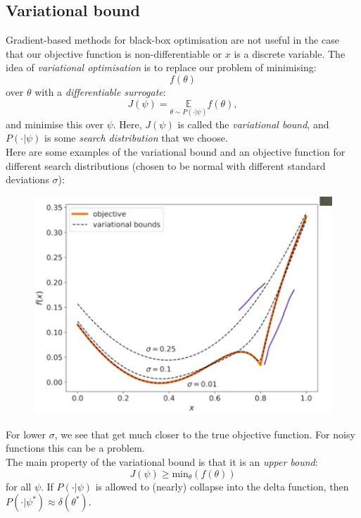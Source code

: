 \subsection{Variational bound}
Gradient-based methods for black-box optimisation are not useful in the case that our objective function is non-differentiable or $x$ is a discrete variable. The idea of \textit{variational optimisation} is to replace our problem of minimising:
\begin{equation*}
f(\theta)
\end{equation*}
over $\theta$ with a \textit{differentiable surrogate}:
\begin{equation*}
J(\psi) = \underset{\theta \sim P(\cdot|\psi)}{\mathbb{E}} f(\theta),
\end{equation*}
and minimise this over $\psi$. Here, $J(\psi)$ is called the \textit{variational bound}, and $P(\cdot | \psi)$ is some \textit{search distribution} that we choose.\\

Here are some examples of the variational bound and an objective function for different search distributions (chosen to be normal with different standard deviations $\sigma$):
\begin{figure}[H]
\centering
\includegraphics[scale=0.4]{variationalbounds.png}
\end{figure}
For lower $\sigma$, we see that get much closer to the true objective function. For noisy functions this can be a problem.\\

The main property of the variational bound is that it is an \textit{upper bound}:
\begin{equation*}
J(\psi) \geq \textrm{min}_{\theta}(f(\theta))
\end{equation*}
for all $\psi$. If $P(\cdot | \psi)$ is allowed to (nearly) collapse into the delta function, then $P(\cdot | \psi^*) \approx \delta(\theta^*)$.\\

